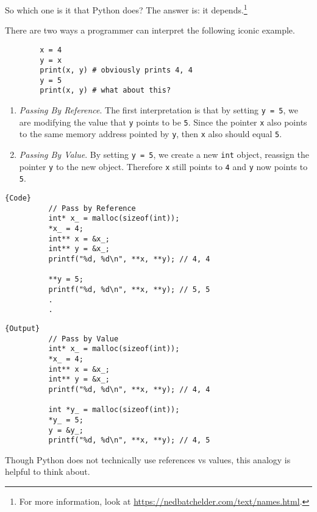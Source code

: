 \documentclass{article}
\begin{document}
    So which one is it that Python does? The answer is: it depends.\footnote{For more information, look at \href{https://nedbatchelder.com/text/names.html}{https://nedbatchelder.com/text/names.html}.} 

    \begin{example}
      There are two ways a programmer can interpret the following iconic example.
      \begin{lstlisting}
        x = 4 
        y = x 
        print(x, y) # obviously prints 4, 4
        y = 5
        print(x, y) # what about this? 
      \end{lstlisting}

      \begin{enumerate}
        \item \textit{Passing By Reference}. The first interpretation is that by setting \texttt{y = 5}, we are modifying the value that \texttt{y} points to be \texttt{5}. Since the pointer \texttt{x} also points to the same memory address pointed by \texttt{y}, then \texttt{x} also should equal \texttt{5}. 
        \item \textit{Passing By Value}. By setting \texttt{y = 5}, we create a new \texttt{int} object, reassign the pointer \texttt{y} to the new object. Therefore \texttt{x} still points to \texttt{4} and \texttt{y} now points to \texttt{5}. 
      \end{enumerate}
      \noindent\begin{minipage}{.5\textwidth}
        \begin{lstlisting}[]{Code}
          // Pass by Reference
          int* x_ = malloc(sizeof(int)); 
          *x_ = 4; 
          int** x = &x_; 
          int** y = &x_; 
          printf("%d, %d\n", **x, **y); // 4, 4

          **y = 5; 
          printf("%d, %d\n", **x, **y); // 5, 5
          .
          .
        \end{lstlisting}
        \end{minipage}
        \hfill
        \begin{minipage}{.49\textwidth}
        \begin{lstlisting}[]{Output}
          // Pass by Value
          int* x_ = malloc(sizeof(int)); 
          *x_ = 4; 
          int** x = &x_; 
          int** y = &x_; 
          printf("%d, %d\n", **x, **y); // 4, 4

          int *y_ = malloc(sizeof(int)); 
          *y_ = 5; 
          y = &y_; 
          printf("%d, %d\n", **x, **y); // 4, 5
        \end{lstlisting}
      \end{minipage}

      Though Python does not technically use references vs values, this analogy is helpful to think about.  
    \end{example}
\end{document}
